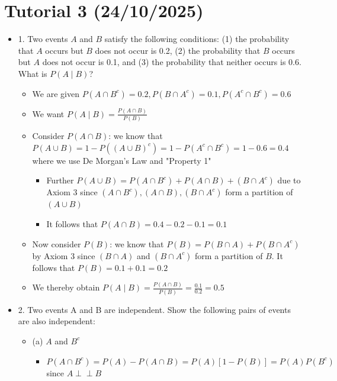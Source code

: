 \documentclass{article}
\newcommand{\indep}{\perp\!\!\!\perp}
\begin{document}
\section{Tutorial 3 (24/10/2025)}
\begin{itemize}
\subsection{Problem Set 2}
    \item 1.  Two events $A$ and $B$ satisfy the following conditions: (1) the probability that $A$ occurs but $B$ does not occur is 0.2, (2) the probability that $B$ occurs but $A$ does not occur is 0.1, and (3) the probability that neither occurs is 0.6. What is $P(A \mid B)$?
    \begin{itemize}
        \item We are given $P(A \cap B^c) = 0.2, P(B \cap A^c) = 0.1, P(A^c \cap B^c) = 0.6$
        \item We want $P(A \mid B) = \frac{P(A \cap B)}{P(B)}$
        \item Consider $P(A \cap B)$: we know that $P(A \cup B) = 1- P((A \cup B)^c) = 1 - P(A^c \cap B^c) = 1-0.6 = 0.4$ where we use De Morgan's Law and "Property 1"
        \begin{itemize}
            \item Further $P(A \cup B) = P(A \cap B^c) + P(A \cap B) + (B \cap A^c)$ due to Axiom 3 since $(A \cap B^c), (A \cap B), (B \cap A^c)$ form a partition of $(A \cup B)$
            \item It follows that $P(A \cap B) = 0.4-0.2-0.1=0.1$
        \end{itemize}
        \item Now consider $P(B)$: we know that $P(B) = P(B \cap A) + P(B \cap A^c)$ by Axiom 3 since $(B \cap A)$ and $(B \cap A^c)$ form a partition of $B$. It follows that $P(B) = 0.1+0.1 = 0.2$
        \item We thereby obtain $P(A \mid B) = \frac{P(A \cap B)}{P(B)} = \frac{0.1}{0.2} = 0.5$
    \end{itemize}
    \item 2. Two events A and B are independent. Show the following pairs of events are also independent:
    \begin{itemize}
        \item (a) $A$ and $B^c$
        \begin{itemize}
            \item $P(A \cap B^c) = P(A) - P(A \cap B) = P(A) [1 - P(B)] = P(A)P(B^c)$ since $A \indep B$

\end{itemize}
\end{itemize}
\end{itemize}
\end{document}
